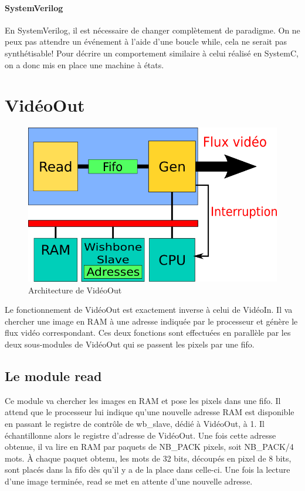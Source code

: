 \documentclass[a4paper,12pt]{report}
\begin{document}
{{\paragraph{SystemVerilog}
En SystemVerilog, il est nécessaire de changer complètement de paradigme.
On ne peux pas attendre un événement à l'aide d'une boucle while,
cela ne serait pas synthétisable!
Pour décrire un comportement similaire à celui réalisé en SystemC, on a donc mis en place une machine à états.




{}

\newpage

    \section*{VidéoOut}

\begin{figure}[!h]
	\centering
	\includegraphics[scale = 0.5]{video_out.png}
	\caption{Architecture de VidéoOut}
\end{figure}

Le fonctionnement de VidéoOut est exactement inverse à celui de VidéoIn.
Il va chercher une image en RAM à une adresse indiquée par le processeur
et génère le flux vidéo correspondant.
Ces deux fonctions sont effectuées en parallèle par les deux sous-modules de VidéoOut qui se passent
les pixels par une fifo.

\subsection{Le module read}
Ce module va chercher les images en RAM et pose les pixels dans une fifo.
Il attend que le processeur lui indique qu'une nouvelle adresse RAM est disponible en passant le registre de contrôle de wb\_slave, dédié à VidéoOut, à 1.
Il échantillonne alors le registre d'adresse de VidéoOut.
Une fois cette adresse obtenue, il va lire en RAM par paquets de NB\_PACK pixels, soit NB\_PACK/4 mots.
À chaque paquet obtenu, les mots de 32 bits, découpés en pixel de 8 bits, sont placés dans la fifo dès qu'il y a de la place dans celle-ci.
Une fois la lecture d'une image terminée, read se met en attente d'une nouvelle adresse.

}}
\end{document}

